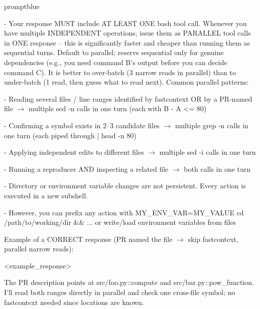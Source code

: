 \begin{promptbox}{promptblue}
{- Your response MUST include AT LEAST ONE bash tool call. Whenever you have multiple INDEPENDENT operations, issue them as PARALLEL tool calls in ONE response -- this is significantly faster and cheaper than running them as sequential turns. Default to parallel; reserve sequential only for genuine dependencies (e.g., you need command B's output before you can decide command C). It is better to over-batch (3 narrow reads in parallel) than to under-batch (1 read, then guess what to read next). Common parallel patterns:\par
\hspace*{0.90em}- Reading several files / line ranges identified by fastcontext OR by a PR-named file $\to$ multiple \textasciigrave{}sed -n\textasciigrave{} calls in one turn (each with \textasciigrave{}B - A \textless{}= 80\textasciigrave{})\par
\hspace*{0.90em}- Confirming a symbol exists in 2--3 candidate files $\to$ multiple \textasciigrave{}grep -n\textasciigrave{} calls in one turn (each piped through \textasciigrave{}| head -n 80\textasciigrave{})\par
\hspace*{0.90em}- Applying independent edits to different files $\to$ multiple \textasciigrave{}sed -i\textasciigrave{} calls in one turn\par
\hspace*{0.90em}- Running a reproducer AND inspecting a related file $\to$ both calls in one turn\par
- Directory or environment variable changes are not persistent. Every action is executed in a new subshell.\par
- However, you can prefix any action with \textasciigrave{}MY\_ENV\_VAR=MY\_VALUE cd /path/to/working/dir \&\& ...\textasciigrave{} or write/load environment variables from files\par
\vspace{0.35em}\par
Example of a CORRECT response (PR named the file $\to$ skip fastcontext, parallel narrow reads):\par
\textless{}example\_response\textgreater{}\par
The PR description points at \textasciigrave{}src/foo.py::compute\textasciigrave{} and \textasciigrave{}src/bar.py::pow\_function\textasciigrave{}. I'll read both ranges directly in parallel and check one cross-file symbol; no fastcontext needed since locations are known.\par
}
\end{promptbox}
